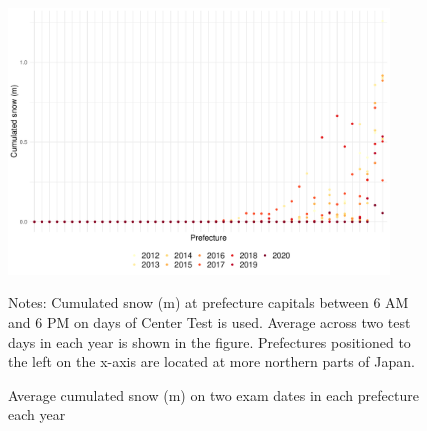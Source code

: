 \documentclass[12pt,letterpaper]{article}
\begin{document}
\begin{figure}[H]
  \centering
  \caption{Average cumulated snow (m) on two exam dates in each prefecture each year}
  \includegraphics[width = 0.9\textwidth]{../Output/images/cum_snow_diff.pdf}
  \label{fig:cum_snow_diff}
  \footnotesize
  \begin{tablenotes}
    \item Notes:
      Cumulated snow (m) at prefecture capitals between 6 AM and 6 PM on days of Center Test is used.
      Average across two test days in each year is shown in the figure.
      Prefectures positioned to the left on the x-axis are located at more northern parts of Japan.
  \end{tablenotes}
\end{figure}
\end{document}
